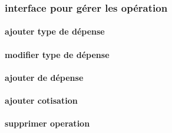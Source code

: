 \subsubsection{interface pour gérer les opération}
\paragraph{ajouter type de dépense}
\paragraph{modifier type de dépense}
\paragraph{ajouter de dépense}
\paragraph{ajouter cotisation}
\paragraph{supprimer operation}


